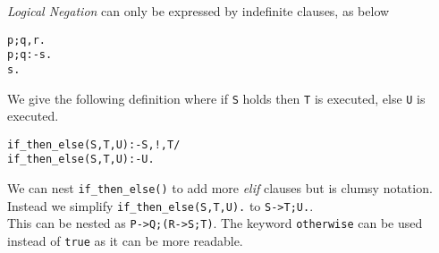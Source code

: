\documentclass[11pt,a4paper]{article}
\begin{document}
\textit{Logical Negation} can only be expressed by indefinite clauses, as below
\begin{lstlisting}
p;q,r.
p;q:-s.
s.
\end{lstlisting}


We give the following definition where if \lstinline!S! holds then \lstinline!T! is executed, else \lstinline!U! is executed.
\begin{lstlisting}
if_then_else(S,T,U):-S,!,T/
if_then_else(S,T,U):-U.
\end{lstlisting}

We can nest \lstinline!if_then_else()! to add more \textit{elif} clauses but is clumsy notation.\\
Instead we simplify \lstinline!if_then_else(S,T,U).! to \lstinline!S->T;U.!.\\
This can be nested as \lstinline!P->Q;(R->S;T)!. The keyword \lstinline!otherwise! can be used instead of \lstinline!true! as it can be more readable.

\end{document}
